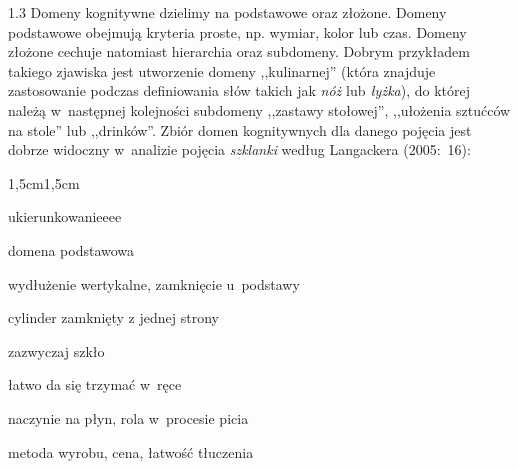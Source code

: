 \documentclass[11pt,a4paper,twoside]{report}
\begin{document}
\begin{spacing}{1.3}
Domeny kognitywne dzielimy na podstawowe oraz złożone. Domeny podstawo\-we obejmują kryteria proste, np. wymiar, kolor lub czas. Domeny złożone cechuje natomiast hierarchia oraz subdomeny. Dobrym przykładem takiego zjawiska jest utworzenie domeny ,,kulinarnej''  (która znajduje zastosowanie podczas definiowania słów takich jak \emph{nóż} lub \emph{łyżka}), do której należą w~następnej kolejności subdomeny ,,zastawy stołowej'', ,,ułożenia sztućców na stole'' lub ,,drinków''. Zbiór domen kognitywnych dla danego pojęcia jest dobrze widoczny w~analizie pojęcia \emph{szklanki} według Langackera (2005:~16):\\

\begin{adjustwidth}{1,5cm}{1,5cm}
\begin{labeling}{ukierunkowanieeee}

\item [\textbf{przestrzeń}] domena podstawowa
\item [\textbf{ukierunkowanie}] wydłużenie wertykalne, zamknięcie u~podstawy
\item [\textbf{kształt}] cylinder zamknięty z jednej strony
\item [\textbf{materiał}] zazwyczaj szkło
\item [\textbf{rozmiar}] łatwo da się trzymać w~ręce
\item [\textbf{funkcja}] naczynie na płyn, rola w~procesie picia
\item [\textbf{inne}] metoda wyrobu, cena, łatwość tłuczenia

\end{labeling}
\end{adjustwidth}



\end{spacing}
\end{document}
